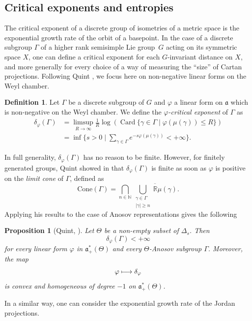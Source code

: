 \documentclass[JEP,XML,SOM,Unicode,NoEqCountersInSection,NoFloatCountersInSection,published]{cedram}
\newcommand\mto{\mathchoice{\longmapsto}{\mapsto}{\mapsto}{\mapsto}}
\newtheorem{prop}[theo]{Proposition}
\theoremstyle{definition}
\newtheorem{defi}[theo]{Definition}
\newcommand{\R}{\mathbb{R}}
\newcommand{\N}{\mathbb{N}}
\newcommand{\Cone}{\mathrm{Cone}}
\newcommand{\fa}{\mathfrak{a}}
\DeclareMathOperator{\Card}{Card}
\let\phi\varphi
\let\G\Gamma
\let\g\gamma
\begin{document}
\subsection{Critical exponents and entropies} \label{subsec - Critical exponents symmetric space}

The critical exponent of a discrete group of isometries of a metric space is the exponential growth rate of the orbit of a basepoint. In the case of a discrete subgroup $\G$ of a higher rank semisimple Lie group~$G$ acting on its symmetric space $X$, one can define a critical exponent for each $G$\nobreakdash-invariant distance on $X$, and more generally for every choice of a way of measuring the ``size'' of Cartan projections. Following Quint \cite{quint2002divergence}, we focus here on non-negative linear forms on the Weyl chamber.

\begin{defi}
Let $\G$ be a discrete subgroup of $G$ and $\varphi$ a linear form on $\fa$ which is non-negative on the Weyl chamber. We define the \emph{$\varphi$-critical exponent} of $\G$ as
\begin{align*}
\delta_\varphi(\G) &= \limsup_{R\to \infty} \frac{1}{R} \log \left(\Card \{ \g \in \G \mid \varphi(\mu(\g)) \leq R\} \right)\\
&\textstyle= \inf\bigl\{s>0\mid \sum_{\g\in \G} e^{-s\varphi(\mu(\g))} < +\infty\bigr\}.
\end{align*}
\end{defi}

In full generality, $\delta_\varphi(\G)$ has no reason to be finite. However, for finitely generated groups, Quint showed in \cite{quint2002divergence} that $\delta_\phi(\G)$ is finite as soon as $\varphi$ is positive on the \emph{limit cone} of $\G$, defined as
\[\Cone(\G) = \bigcap_{n\in \N}\overline{\bigcup_{\substack{\g \in \G\\ \vert \g \vert \geq n}} \R \mu(\g)}.\]
Applying his results to the case of Anosov representations gives the following
\begin{prop}[Quint, \cite{quint2002divergence}]
Let $\Theta$ be a non-empty subset of $\Delta_s$. Then
\[\delta_\varphi(\G) < +\infty\]
for every linear form $\varphi$ in $\fa_+^*(\Theta)$ and every $\Theta$-Anosov subgroup $\G$. Moreover, the map
\[\varphi \mto \delta_\varphi\]
is convex and homogeneous of degree $-1$ on $\fa_+^*(\Theta)$.
\end{prop}

In a similar way, one can consider the exponential growth rate of the Jordan projections.
\end{document}
